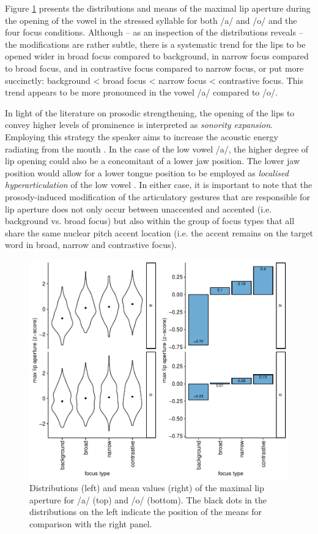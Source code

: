 Figure \ref{fig:eukl_max} presents the distributions and means of the maximal lip aperture during the opening of the vowel in the stressed syllable for both /a/ and /o/ and the four focus conditions. Although -- as an inspection of the distributions reveals -- the modifications are rather subtle, there is a systematic trend for the lips to be opened wider in broad focus compared to background, in narrow focus compared to broad focus, and in contrastive focus compared to narrow focus, or put more succinctly: background < broad focus < narrow focus < contrastive focus. This trend appears to be more pronounced in the vowel /a/ compared to /o/.

In light of the literature on prosodic strengthening, the opening of the lips to convey higher levels of prominence is interpreted as \emph{sonority expansion}. Employing this strategy the speaker aims to increase the acoustic energy radiating from the mouth \citep{BeckmanEdwardsFletcher1992}. In the case of the low vowel /a/, the higher degree of lip opening could also be a concomitant of a lower jaw position. The lower jaw position would allow for a lower tongue position to be employed as \emph{localised hyperarticulation} of the low vowel \citep{DeJong1995}. In either case, it is important to note that the prosody-induced modification of the articulatory gestures that are responsible for lip aperture does not only occur between unaccented and accented (i.e. background vs. broad focus) but also within the group of focus types that all share the same nuclear pitch accent location (i.e. the accent remains on the target word in broad, narrow and contrastive focus).

\begin{figure}
\includegraphics[width=\textwidth]{figures/ch7/eukl_max.pdf}
\caption[Distributions and mean values of the maximal lip aperture.]{Distributions (left) and mean values (right) of the maximal lip aperture for /a/ (top) and /o/ (bottom). The black dots in the distributions on the left indicate the position of the means for comparison with the right panel.}
\label{fig:eukl_max}
\end{figure}

